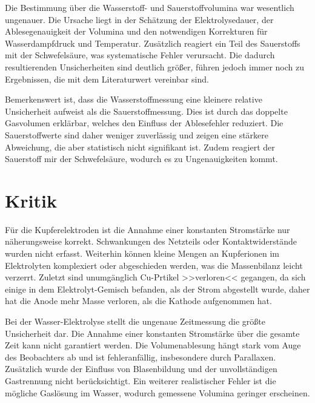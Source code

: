 Die Bestimmung über die Wasserstoff- und Sauerstoffvolumina war wesentlich ungenauer. 
Die Ursache liegt in der Schätzung der Elektrolysedauer, der Ablesegenauigkeit der Volumina und den notwendigen Korrekturen für Wasserdampfdruck und Temperatur. 
Zusätzlich reagiert ein Teil des Sauerstoffs mit der Schwefelsäure, was systematische Fehler verursacht. 
Die dadurch resultierenden Unsicherheiten sind deutlich größer, führen jedoch immer noch zu Ergebnissen, die mit dem Literaturwert vereinbar sind.  

Bemerkenswert ist, dass die Wasserstoffmessung eine kleinere relative Unsicherheit aufweist als die Sauerstoffmessung. 
Dies ist durch das doppelte Gasvolumen erklärbar, welches den Einfluss der Ablesefehler reduziert. 
Die Sauerstoffwerte sind daher weniger zuverlässig und zeigen eine stärkere Abweichung, die aber statistisch nicht signifikant ist.  
Zudem reagiert der Sauerstoff mir der Schwefelsäure, wodurch es zu Ungenauigkeiten kommt.

\section{Kritik}
Für die Kupferelektroden ist die Annahme einer konstanten Stromstärke nur näherungsweise korrekt. 
Schwankungen des Netzteils oder Kontaktwiderstände wurden nicht erfasst. 
Weiterhin können kleine Mengen an Kupferionen im Elektrolyten komplexiert oder abgeschieden werden, was die Massenbilanz leicht verzerrt.  
Zuletzt sind unumgänglich Cu-Prtikel >>verloren<< gegangen, da sich einige in dem Elektrolyt-Gemisch befanden, als der Strom abgestellt wurde, daher hat die Anode mehr Masse verloren, als die Kathode aufgenommen hat.

Bei der Wasser-Elektrolyse stellt die ungenaue Zeitmessung die größte Unsicherheit dar. 
Die Annahme einer konstanten Stromstärke über die gesamte Zeit kann nicht garantiert werden. 
Die Volumenablesung hängt stark vom Auge des Beobachters ab und ist fehleranfällig, insbesondere durch Parallaxen. 
Zusätzlich wurde der Einfluss von Blasenbildung und der unvollständigen Gastrennung nicht berücksichtigt.  
Ein weiterer realistischer Fehler ist die mögliche Gaslösung im Wasser, wodurch gemessene Volumina geringer erscheinen.  
